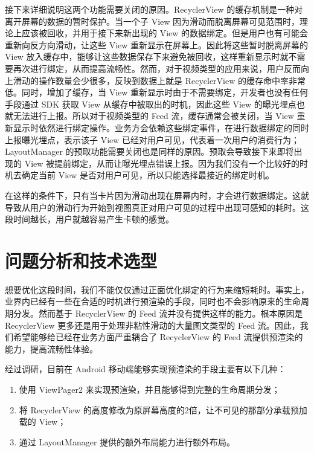 接下来详细说明这两个功能需要关闭的原因。RecyclerView 的缓存机制是一种对离开屏幕的数据的暂时保护。当一个子 View 因为滑动而脱离屏幕可见范围时，理论上应该被回收，并用于接下来新出现的 View 的数据绑定。但是用户也有可能会重新向反方向滑动，让这些 View 重新显示在屏幕上。因此将这些暂时脱离屏幕的 View 放入缓存中，能够让这些数据保存下来避免被回收，这样重新显示时就不需要再次进行绑定，从而提高流畅性。然而，对于视频类型的应用来说，用户反而向上滑动的操作数量会少很多，反映到数据上就是 RecyclerView 的缓存命中率非常低。同时，增加了缓存，当 View 重新显示时由于不需要绑定，开发者也没有任何手段通过 SDK 获取 View 从缓存中被取出的时机，因此这些 View 的曝光埋点也就无法进行上报。所以对于视频类型的 Feed 流，缓存通常会被关闭，当 View 重新显示时依然进行绑定操作。业务方会依赖这些绑定事件，在进行数据绑定的同时上报曝光埋点，表示该子 View 已经对用户可见，代表着一次用户的消费行为；LayoutManager 的预取功能需要关闭也是同样的原因。预取会导致接下来即将出现的 View 被提前绑定，从而让曝光埋点错误上报。因为我们没有一个比较好的时机去确定当前 View 是否对用户可见，所以只能选择最接近的绑定时机。

在这样的条件下，只有当卡片因为滑动出现在屏幕内时，才会进行数据绑定。这就导致从用户的滑动行为开始到视图真正对用户可见的过程中出现可感知的耗时。这段时间越长，用户就越容易产生卡顿的感觉。

\section{问题分析和技术选型}

想要优化这段时间，我们不能仅仅通过正面优化绑定的行为来缩短耗时。事实上，业界内已经有一些在合适的时机进行预渲染的手段，同时也不会影响原来的生命周期分发。然而基于 RecyclerView 的 Feed 流并没有提供这样的能力。根本原因是 RecyclerView 更多还是用于处理非粘性滑动的大量图文类型的 Feed 流。因此，我们希望能够给已经在业务方面严重耦合了 RecyclerView 的 Feed 流提供预渲染的能力，提高流畅性体验。

经过调研，目前在 Android 移动端能够实现预渲染的手段主要有以下几种：

\begin{enumerate}
    \item 使用 ViewPager2 来实现预渲染，并且能够得到完整的生命周期分发；
    \item 将 RecyclerView 的高度修改为原屏幕高度的2倍，让不可见的那部分承载预加载的 View；
    \item 通过 LayoutManager 提供的额外布局能力进行额外布局。
\end{enumerate}

